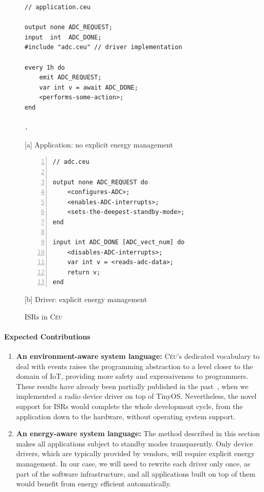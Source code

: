 \documentclass[12pt,english]{amsart}
\newcommand{\CEU}{\textsc{C\'{e}u}\xspace}
\begin{document}
{\linespread{1}
\begin{figure}[t]
\begin{minipage}[t]{0.56\linewidth}
\begin{lstlisting}[xrightmargin=1cm]
// application.ceu

output none ADC_REQUEST;
input  int  ADC_DONE;
#include "adc.ceu" // driver implementation

every 1h do
    emit ADC_REQUEST;
    var int v = await ADC_DONE;
    <performs-some-action>;
end

.
\end{lstlisting}
\centering\small{[a] Application: no explicit energy management}
\end{minipage}
%
\begin{minipage}[t]{0.43\linewidth}
\begin{lstlisting}[numbers=left]
// adc.ceu

output none ADC_REQUEST do
    <configures-ADC>;
    <enables-ADC-interrupts>;
    <sets-the-deepest-standby-mode>;
end

input int ADC_DONE [ADC_vect_num] do
    <disables-ADC-interrupts>;
    var int v = <reads-adc-data>;
    return v;
end
\end{lstlisting}
\centering\small{[b] Driver: explicit energy management }
\end{minipage}
\caption{ ISRs in \CEU
\label{lst.isrs}
}
\end{figure}
}

\paragraph{\textbf{Expected Contributions}}

\begin{enumerate}
\item \textbf{An environment-aware system language:}
    \CEU's dedicated vocabulary to deal with events raises the
    programming abstraction to a level closer to the domain of IoT, providing
    more safety and expressiveness to programmers.
    These results have already been partially published in the
    past~\cite{ceu.sensys13}, when we implemented a radio device driver on top
    of TinyOS.
    Nevertheless, the novel support for ISRs would complete the whole
    development cycle, from the application down to the hardware, without
    operating system support.
\item \textbf{An energy-aware system language:}
    The method described in this section makes all applications subject to
    standby modes transparently.
    Only device drivers, which are typically provided by vendors, will require
    explicit energy management.
    In our case, we will need to rewrite each driver only once, as part of the
    software infrastructure, and all applications built on top of them would
    benefit from energy efficient automatically.
\end{enumerate}
\end{document}
